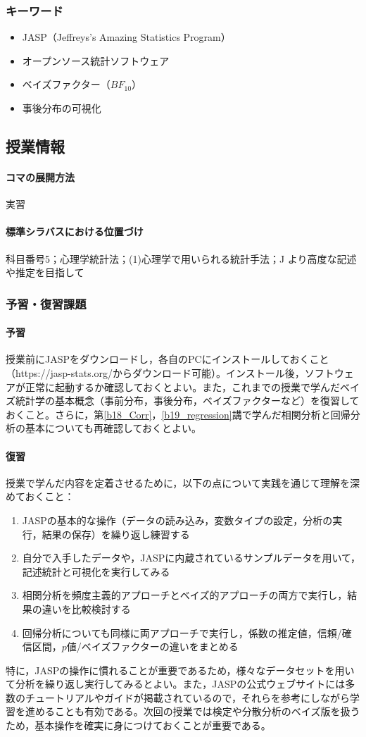 \subsubsection{キーワード}
\begin{itemize}
	\item JASP（Jeffreys's Amazing Statistics Program）
	\item オープンソース統計ソフトウェア
	\item ベイズファクター（$BF_{10}$）
	\item 事後分布の可視化
\end{itemize}
\subsection{授業情報}
\paragraph{コマの展開方法}
実習
\paragraph{標準シラバスにおける位置づけ}
科目番号5；心理学統計法；(1)心理学で用いられる統計手法；J より高度な記述や推定を目指して
\subsubsection{予習・復習課題}
\paragraph{予習}
授業前にJASPをダウンロードし，各自のPCにインストールしておくこと（https://jasp-stats.org/からダウンロード可能）。インストール後，ソフトウェアが正常に起動するか確認しておくとよい。また，これまでの授業で学んだベイズ統計学の基本概念（事前分布，事後分布，ベイズファクターなど）を復習しておくこと。さらに，第\ref{b18_Corr}，\ref{b19_regression}講で学んだ相関分析と回帰分析の基本についても再確認しておくとよい。

\paragraph{復習}
授業で学んだ内容を定着させるために，以下の点について実践を通じて理解を深めておくこと：

\begin{enumerate}
\item JASPの基本的な操作（データの読み込み，変数タイプの設定，分析の実行，結果の保存）を繰り返し練習する
\item 自分で入手したデータや，JASPに内蔵されているサンプルデータを用いて，記述統計と可視化を実行してみる
\item 相関分析を頻度主義的アプローチとベイズ的アプローチの両方で実行し，結果の違いを比較検討する
\item 回帰分析についても同様に両アプローチで実行し，係数の推定値，信頼/確信区間，$p$値/ベイズファクターの違いをまとめる
\end{enumerate}

特に，JASPの操作に慣れることが重要であるため，様々なデータセットを用いて分析を繰り返し実行してみるとよい。また，JASPの公式ウェブサイトには多数のチュートリアルやガイドが掲載されているので，それらを参考にしながら学習を進めることも有効である。次回の授業では検定や分散分析のベイズ版を扱うため，基本操作を確実に身につけておくことが重要である。
